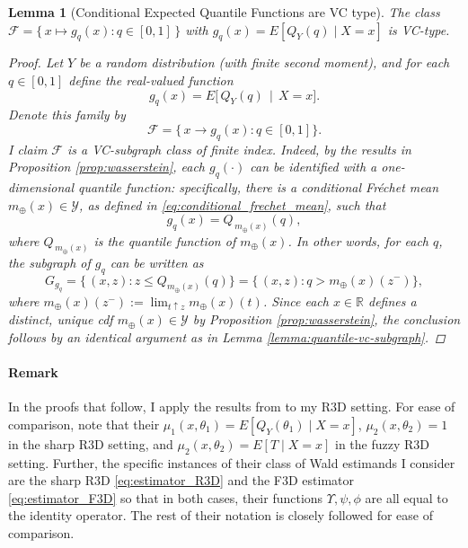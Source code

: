 \documentclass[12pt]{article}
\newtheorem{lemma}{Lemma}
\begin{document}
\begin{lemma}[Conditional Expected Quantile Functions are VC type]
\label{lemma:conditional-quantile-vc}
The class $\mathcal{F}=\{\,x\mapsto g_q(x): q\in[0,1]\,\}$ with $g_q(x)=E[Q_Y(q)\mid X=x]$ is VC-type.
\begin{proof}
Let \(Y\) be a random distribution (with finite second moment), and for each \(q \in [0,1]\) define the real-valued function
\[
   g_q(x) = E\bigl[\,Q_Y(q)\,\mid\,X = x\bigr].
\]
Denote this family by
\[
  \mathcal{F}
  =\bigl\{\,x \to g_q(x) : q \in [0,1]\bigr\}.
\]
I claim \(\mathcal{F}\) is a VC-subgraph class of finite index. Indeed, by the results in Proposition \ref{prop:wasserstein}, each \(g_q(\cdot)\) can be identified with a one-dimensional quantile function: specifically, there is a conditional Fr\'echet mean \(m_{\oplus}(x) \in \mathcal{Y}\), as defined in \eqref{eq:conditional_frechet_mean}, such that
\[
  g_q(x)
  =
  Q_{\,m_{\oplus}(x)}(q),
\]
where \(Q_{\,m_{\oplus}(x)}\) is the quantile function of \(m_{\oplus}(x)\). In other words, for each \(q\), the subgraph of \(g_q\) can be written as
\[
  G_{g_q}
  =
  \bigl\{\,(x,z) : z \le Q_{m_{\oplus}(x)}(q)\bigr\}
  =
  \bigl\{\,(x,z) : q > m_{\oplus}(x)(z^-)\bigr\},
\]
where $m_{\oplus}(x)(z^-):=\lim_{t\uparrow z} m_{\oplus}(x)(t)$. Since each $x \in \mathbb{R}$ defines a distinct, unique cdf $m_{\oplus}(x) \in \mathcal{Y}$ by Proposition \ref{prop:wasserstein}, the conclusion follows by an identical argument as in Lemma \ref{lemma:quantile-vc-subgraph}.
\end{proof}
\end{lemma}


\paragraph{Remark}

In the proofs that follow, I apply the results from \citet{chiang2019robust} to my R3D setting. For ease of comparison, note that their $\mu_{1}(x, \theta_1) = E[Q_Y(\theta_1) \mid X=x]$, $\mu_2(x, \theta_2) = 1$ in the sharp R3D setting, and $\mu_2(x, \theta_2) = E[T \mid X=x]$ in the fuzzy R3D setting. Further, the specific instances of their class of Wald estimands \citep[Eq. 4.1]{chiang2019robust} I consider are the sharp R3D \eqref{eq:estimator_R3D} and the F3D estimator \eqref{eq:estimator_F3D} so that in both cases, their functions $\Upsilon, \psi, \phi$ are all equal to the identity operator. The rest of their notation is closely followed for ease of comparison.
\end{document}
